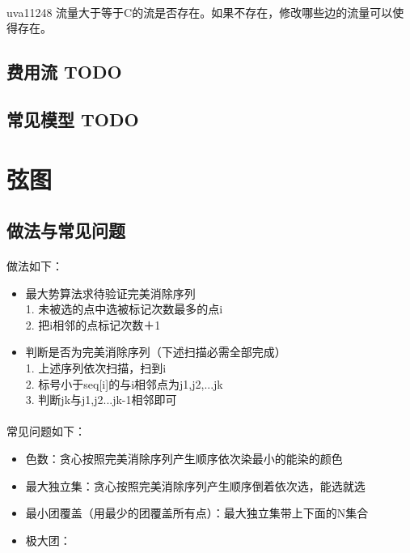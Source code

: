 \documentclass[landscape]{report}
\newcommand{\includecode}[2][c]{}
\begin{document}
\begin{flushleft}
\begin{multicols}{2}
\paragraph{ }
uva11248 流量大于等于C的流是否存在。如果不存在，修改哪些边的流量可以使得存在。
\includecode[c++]{uva11248.cpp}
\subsection{ 费用流 TODO}
\subsection{ 常见模型 TODO}
\section{弦图}
\subsection{ 做法与常见问题}
\paragraph{ }
做法如下：
\begin{itemize}
\item  最大势算法求待验证完美消除序列\\
     1. 未被选的点中选被标记次数最多的点i\\
     2. 把i相邻的点标记次数＋1
 \item  判断是否为完美消除序列（下述扫描必需全部完成）\\
     1. 上述序列依次扫描，扫到i\\
     2. 标号小于seq[i]的与i相邻点为j1,j2,...jk\\
     3. 判断jk与j1,j2...jk-1相邻即可\\
\end{itemize}
\paragraph{ }
常见问题如下：
\begin{itemize}
\item  色数：贪心按照完美消除序列产生顺序依次染最小的能染的颜色
\item 最大独立集：贪心按照完美消除序列产生顺序倒着依次选，能选就选
 \item 最小团覆盖（用最少的团覆盖所有点）：最大独立集带上下面的N集合
  \item 极大团：
  		\begin{itemize}
  		

\end{itemize}
\end{itemize}
\end{multicols}
\end{flushleft}
\end{document}
